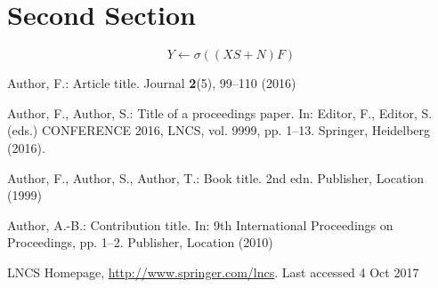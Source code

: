 \documentclass[runningheads]{llncs}
\begin{document}
\section{Second Section}

\begin{equation}
Y\leftarrow \sigma((XS+N)F)
\end{equation}


%
%
%
% 
% 
%
\begin{thebibliography}{8}
Author, F.: Article title. Journal \textbf{2}(5), 99--110 (2016)

Author, F., Author, S.: Title of a proceedings paper. In: Editor,
F., Editor, S. (eds.) CONFERENCE 2016, LNCS, vol. 9999, pp. 1--13.
Springer, Heidelberg (2016). 

Author, F., Author, S., Author, T.: Book title. 2nd edn. Publisher,
Location (1999)

Author, A.-B.: Contribution title. In: 9th International Proceedings
on Proceedings, pp. 1--2. Publisher, Location (2010)

LNCS Homepage, \url{http://www.springer.com/lncs}. Last accessed 4
Oct 2017
\end{thebibliography}
\end{document}
